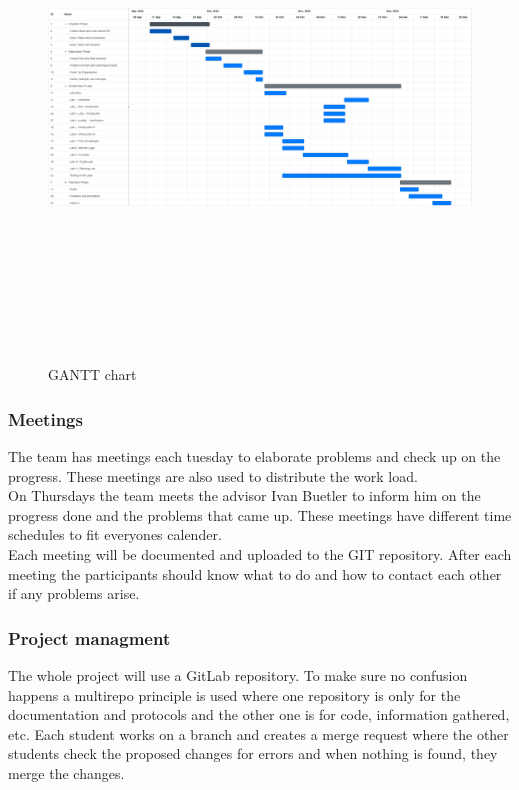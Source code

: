 \begin{figure}[H]
    \centering
    \begin{sideways}
    \includegraphics[width=600pt, height=380pt]{resources/gantt.png}
    \end{sideways}
    \caption{GANTT chart}
    \label{gantt_figure}
\end{figure}



\subsubsection*{Meetings}
The team has meetings each tuesday to elaborate problems and check up on the progress. These meetings are also used to distribute the work load. \\
On Thursdays the team meets the advisor Ivan Buetler to inform him on the progress done and the problems that came up. These meetings have different time schedules to fit everyones calender. \\
Each meeting will be documented and uploaded to the GIT repository. After each meeting the participants should know what to do and how to contact each other if any problems arise.


\subsubsection*{Project managment}
The whole project will use a GitLab repository. To make sure no confusion happens a multirepo principle is used where one repository is only for the documentation and protocols and the other one is for code, information gathered, etc. Each student works on a branch and creates a merge request where the other students check the proposed changes for errors and when nothing is found, they merge the changes. 
